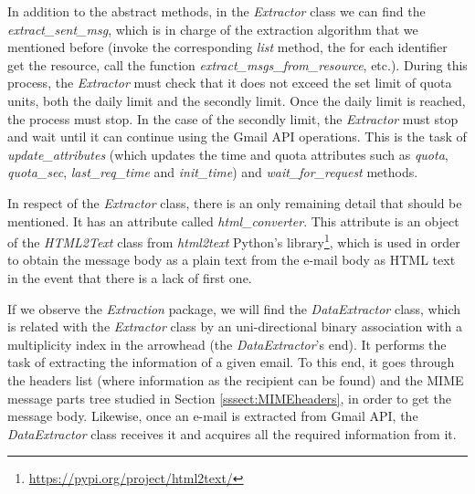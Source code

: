 In addition to the abstract methods, in the \textit{Extractor} class we can find the \textit{extract\_sent\_msg}, which is in charge of the extraction algorithm that we mentioned before (invoke the corresponding \textit{list} method, the for each identifier get the resource, call the function \textit{extract\_msgs\_from\_resource}, etc.). During this process, the \textit{Extractor} must check that it does not exceed the set limit of quota units, both the daily limit and the secondly limit. Once the daily limit is reached, the process must stop. In the case of the secondly limit, the \textit{Extractor} must stop and wait until it can continue using the Gmail API operations. This is the task of \textit{update\_attributes} (which updates the time and quota attributes such as \textit{quota}, \textit{quota\_sec}, \textit{last\_req\_time} and \textit{init\_time}) and \textit{wait\_for\_request} methods.

In respect of the \textit{Extractor} class, there is an only remaining detail that should be mentioned. It has an attribute called \textit{html\_converter}. This attribute is an object of the \textit{HTML2Text} class from \textit{html2text} Python's library\footnote{\url{https://pypi.org/project/html2text/}}, which is used in order to obtain the message body as a plain text from the e-mail body as HTML text in the event that there is a lack of first one.

If we observe the \textit{Extraction} package, we will find the \textit{DataExtractor} class, which is related with the \textit{Extractor} class by an uni-directional binary association with a multiplicity index in the arrowhead (the \textit{DataExtractor}'s end). It performs the task of extracting the information of a given email. To this end, it goes through the headers list (where information as the recipient can be found) and the MIME message parts tree studied in Section \ref{sssect:MIMEheaders}, in order to get the message body. Likewise, once an e-mail is extracted from Gmail API, the \textit{DataExtractor} class receives it and acquires all the required information from it.